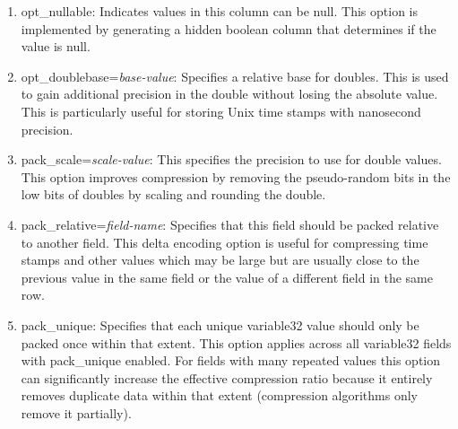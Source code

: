 \begin{enumerate}

\item opt\_nullable: Indicates values in this column can be null.
This option is
implemented by generating a hidden boolean column that determines if
the value is null.

\item opt\_doublebase={\it base-value}: Specifies a relative base for
doubles.  This is used to gain additional precision in the double
without losing the absolute value.  
This is particularly useful for storing Unix time stamps with nanosecond
precision.

\item pack\_scale={\it scale-value}: This specifies the precision to use for
double values.
This option improves compression by removing the pseudo-random bits in the low 
bits of doubles by scaling and rounding the double.  

\item pack\_relative={\it field-name}: Specifies that this field
should be packed relative to another field.  
This delta encoding option is useful 
for compressing time stamps and other values which may be large but are
usually close to the previous value in the same field or the value of a
different field in the same row.

\item pack\_unique: Specifies that each unique variable32 value
should only be packed once within that extent.  This option applies across all variable32
fields with pack\_unique enabled.  For fields with many repeated
values this option can significantly increase the effective
compression ratio because it entirely removes duplicate data within that extent
(compression algorithms only remove it partially).

\end{enumerate}

